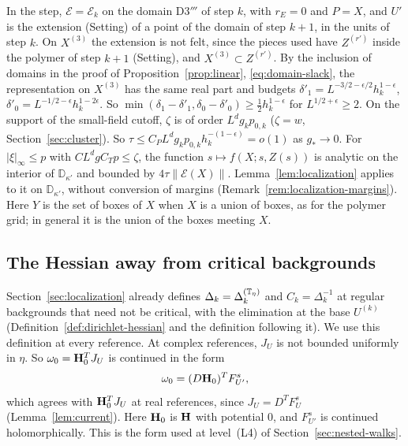In the step, $\mathcal E=\mathcal E_k$ on the domain D3$'''$ of step $k$, with $r_E=0$ and $P=X$, and $U'$ is the extension (Setting) of a point of the domain of step $k+1$, in the units of step $k$. On $X^{(3)}$ the extension is not felt, since the pieces used have $Z^{(r')}$ inside the polymer of step $k+1$ (Setting), and $X^{(3)}\subset Z^{(r')}$. By the inclusion of domains in the proof of Proposition~\ref{prop:linear}, \eqref{eq:domain-slack}, the representation on $X^{(3)}$ has the same real part and budgets $\delta'_1=L^{-3/2-\epsilon/2}h_k^{1-\epsilon}$, $\delta'_0=L^{-1/2-\epsilon}h_k^{1-2\epsilon}$. So $\min(\delta_1-\delta'_1,\delta_0-\delta'_0)\ge\frac12h_k^{1-\epsilon}$ for $L^{1/2+\epsilon}\ge2$. On the support of the small-field cutoff, $\zeta$ is of order $L^dg_kp_{0,k}$ ($\zeta=w$, Section~\ref{sec:cluster}). So $\tau\le C_PL^dg_kp_{0,k}h_k^{-(1-\epsilon)}=o(1)$ as $g_*\to0$. For $|\xi|_\infty\le p$ with $CL^dgC_Tp\le\zeta$, the function $s\mapsto f(X;s,Z(s))$ is analytic on the interior of $\mathbb D_{\kappa'}$ and bounded by $4\tau\|\mathcal E(X)\|$. Lemma~\ref{lem:localization} applies to it on $\mathbb D_{\kappa'}$, without conversion of margins (Remark~\ref{rem:localization-margins}). Here $Y$ is the set of boxes of $X$ when $X$ is a union of boxes, as for the polymer grid; in general it is the union of the boxes meeting $X$.

\subsection{The Hessian away from critical backgrounds}\label{subsec:sq-hessian}

Section~\ref{sec:localization} already defines $\Delta_k=\Delta_k^{(\mathbb T_\eta)}$ and $C_k=\Delta_k^{-1}$ at regular backgrounds that need not be critical, with the elimination at the base $U^{(k)}$ (Definition~\ref{def:dirichlet-hessian} and the definition following it). We use this definition at every reference. At complex references, $J_U$ is not bounded uniformly in $\eta$. So $\omega_0=\mathbf H_0^TJ_U$ is continued in the form
\[
\omega_0=(D\mathbf H_0)^TF^s_{U'},
\]
which agrees with $\mathbf H_0^TJ_U$ at real references, since $J_U=D^TF^s_U$ (Lemma~\ref{lem:current}). Here $\mathbf H_0$ is $\mathbf H$ with potential $0$, and $F^s_{U'}$ is continued holomorphically. This is the form used at level~(L4) of Section~\ref{sec:nested-walks}.

